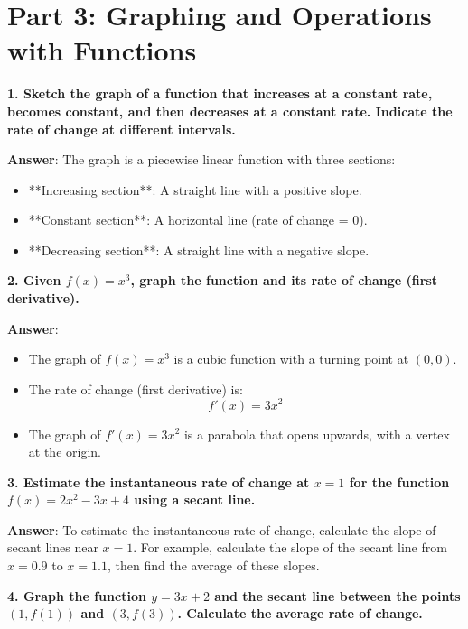\documentclass{article}
\begin{document}
\newpage

\section*{Part 3: Graphing and Operations with Functions}

\textbf{1. Sketch the graph of a function that increases at a constant rate, becomes constant, and then decreases at a constant rate. Indicate the rate of change at different intervals.}

\textbf{Answer}: The graph is a piecewise linear function with three sections:
\begin{itemize}
    \item **Increasing section**: A straight line with a positive slope.
    \item **Constant section**: A horizontal line (rate of change = 0).
    \item **Decreasing section**: A straight line with a negative slope.
\end{itemize}

\bigskip

\textbf{2. Given \( f(x) = x^3 \), graph the function and its rate of change (first derivative).}

\textbf{Answer}: 
\begin{itemize}
    \item The graph of \( f(x) = x^3 \) is a cubic function with a turning point at \( (0, 0) \).
    \item The rate of change (first derivative) is:
    \[
    f'(x) = 3x^2
    \]
    \item The graph of \( f'(x) = 3x^2 \) is a parabola that opens upwards, with a vertex at the origin.
\end{itemize}

\bigskip

\textbf{3. Estimate the instantaneous rate of change at \( x = 1 \) for the function \( f(x) = 2x^2 - 3x + 4 \) using a secant line.}

\textbf{Answer}: 
To estimate the instantaneous rate of change, calculate the slope of secant lines near \( x = 1 \). For example, calculate the slope of the secant line from \( x = 0.9 \) to \( x = 1.1 \), then find the average of these slopes.

\bigskip

\textbf{4. Graph the function \( y = 3x + 2 \) and the secant line between the points \( (1, f(1)) \) and \( (3, f(3)) \). Calculate the average rate of change.}
\end{document}
